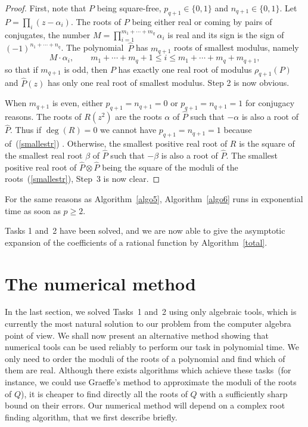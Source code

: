 \begin{proof} First, note that $P$ being square-free, $p_{q+1} \in \{
0,1 \}$ and $n_{q+1} \in \{ 0,1 \}$.
Let $P=\prod_i(z-\alpha_i)$. 
The roots of $P$ being either real or coming by pairs of conjugates, the number
$M=\prod_{i=1}^{m_1+\cdots+m_q} \alpha_i$ is real and its sign
is the sign of~$(-1)^{n_1+\cdots+n_q}$. The polynomial~$\widehat{P}$
has $m_{q+1}$ 
roots of smallest modulus, namely
\begin{equation}\label{smallestr}
M \cdot \alpha_i, \qquad  m_1+\cdots+m_q+1 \leq i \leq
m_1+\cdots+m_q+m_{q+1},
\end{equation}
so that if $m_{q+1}$ is odd, then $P$ has exactly one real root of
modulus $\rho_{q+1}(P)$ and $\widehat{P}(z)$  has
only one real root of smallest modulus. Step 2 is now obvious.

When $m_{q+1}$ is even, either $p_{q+1}=n_{q+1}=0$ or
$p_{q+1}=n_{q+1}=1$ for conjugacy reasons. The roots of
$R(z^2)$ are the roots $\alpha$ of $\widehat{P}$ such that
$-\alpha$ is also a root of $\widehat{P}$. Thus
if $\deg(R)=0$ we cannot have $p_{q+1}=n_{q+1}=1$ because
of~(\ref{smallestr}) . Otherwise, 
the smallest positive real root of $R$ is the square of the smallest
real root $\beta$ of $\widehat{P}$ such that $-\beta$ is also a root
of $\widehat{P}$. The
smallest positive real root of $\widehat{P}\otimes\widehat{P}$ being the
square of the moduli of the roots~(\ref{smallestr}), Step~3 is
now clear.
\end{proof}

For the same reasons as
Algorithm~\ref{algo5}, Algorithm~\ref{algo6} runs in exponential time
as soon as $p \geq 2$.

Tasks 1 and~2 have been solved, and we are now able to give the
asymptotic expansion of the coefficients of a rational function by
Algorithm~\ref{total}. 

\section{The numerical method}
In the last section, we solved Tasks~1 and~2 
using only algebraic tools, which is currently the most natural
solution to our problem from the computer algebra point of view.
We shall now present an alternative method showing that numerical
tools can be used reliably to perform our task in polynomial time.
We only need to order the moduli of the roots of a polynomial and find
which of them are real. Although there exists algorithms which achieve these
tasks~(for instance, we could use Graeffe's method to approximate the
moduli of the roots  of $Q$),
it is cheaper to find directly all the roots of $Q$ with a
sufficiently sharp bound on their errors.
Our numerical method will depend on a
complex root finding algorithm, that we first describe briefly.

